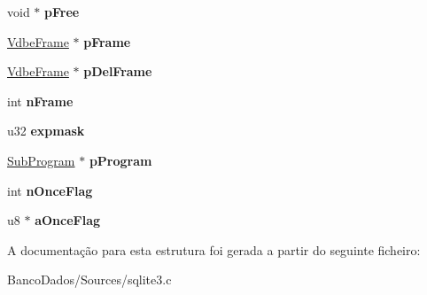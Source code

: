 \begin{DoxyCompactItemize}
\item 
\hypertarget{struct_vdbe_a68dcaae5d4f061da3d7bb96c120fe9a4}{void $\ast$ {\bfseries p\-Free}}\label{struct_vdbe_a68dcaae5d4f061da3d7bb96c120fe9a4}

\item 
\hypertarget{struct_vdbe_afd754aaedd6cd5b229fbeff33177fe04}{\hyperlink{struct_vdbe_frame}{Vdbe\-Frame} $\ast$ {\bfseries p\-Frame}}\label{struct_vdbe_afd754aaedd6cd5b229fbeff33177fe04}

\item 
\hypertarget{struct_vdbe_ab8f22136c8bdb4c02962a1ae081e9116}{\hyperlink{struct_vdbe_frame}{Vdbe\-Frame} $\ast$ {\bfseries p\-Del\-Frame}}\label{struct_vdbe_ab8f22136c8bdb4c02962a1ae081e9116}

\item 
\hypertarget{struct_vdbe_a27fbd083a0335ac2b332d37ea2b90bdc}{int {\bfseries n\-Frame}}\label{struct_vdbe_a27fbd083a0335ac2b332d37ea2b90bdc}

\item 
\hypertarget{struct_vdbe_a5e22eedb6ee963a0bcf27fc9fd8b8e43}{u32 {\bfseries expmask}}\label{struct_vdbe_a5e22eedb6ee963a0bcf27fc9fd8b8e43}

\item 
\hypertarget{struct_vdbe_a9239ea72573142101328be15c90de62b}{\hyperlink{struct_sub_program}{Sub\-Program} $\ast$ {\bfseries p\-Program}}\label{struct_vdbe_a9239ea72573142101328be15c90de62b}

\item 
\hypertarget{struct_vdbe_a55e673e0ba209872b23c64c87b36bf56}{int {\bfseries n\-Once\-Flag}}\label{struct_vdbe_a55e673e0ba209872b23c64c87b36bf56}

\item 
\hypertarget{struct_vdbe_a015887ad1c7c597fb78dc08060cb3dc6}{u8 $\ast$ {\bfseries a\-Once\-Flag}}\label{struct_vdbe_a015887ad1c7c597fb78dc08060cb3dc6}

\end{DoxyCompactItemize}


A documentação para esta estrutura foi gerada a partir do seguinte ficheiro\-:\begin{DoxyCompactItemize}
\item 
Banco\-Dados/\-Sources/sqlite3.\-c\end{DoxyCompactItemize}
